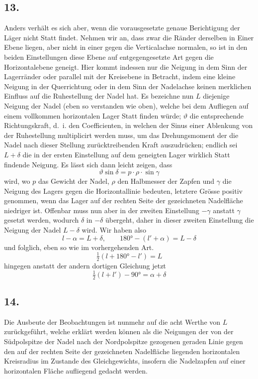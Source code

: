 \documentclass[12pt,a4paper]{article}
\begin{document}
\subsection*{13.}
Anders verhält es sich aber, wenn die vorausgesetzte genaue Berichtigung der Läger nicht Statt findet. Nehmen wir an, dass zwar die Ränder derselben in Einer Ebene liegen, aber nicht in einer gegen die Verticalachse normalen, so ist in den beiden Einstellungen diese Ebene auf entgegengesetzte Art gegen die Horizontalebene geneigt. Hier kommt indessen nur die Neigung in dem Sinn der Lagerränder oder parallel mit der Kreisebene in Betracht, indem eine kleine Neigung in der Querrichtung oder in dem Sinn der Nadelachse keinen merklichen Einfluss auf die Ruhestellung der Nadel hat. Es bezeichne nun $L$ diejenige Neigung der Nadel (eben so verstanden wie oben), welche bei dem Aufliegen auf einem vollkommen horizontalen Lager Statt finden würde; $\vartheta$ die entsprechende Richtungskraft, d.~i. den Coefficienten, in welchen der Sinus einer Ablenkung von der Ruhestellung multiplicirt werden muss, um das Drehungsmoment der die Nadel nach dieser Stellung zurücktreibenden Kraft auszudrücken; endlich sei $L + \delta$ die in der ersten Einstellung auf dem geneigten Lager wirklich Statt findende Neigung. Es lässt sich dann leicht zeigen, dass
\[ \vartheta \sin \delta = p \cdot \rho \cdot \sin \gamma \]
wird, wo $p$ das Gewicht der Nadel, $\rho$ den Halbmesser der Zapfen und $\gamma$ die Neigung des Lagers gegen die Horizontallinie bedeuten, letztere Grösse positiv genommen, wenn das Lager auf der rechten Seite der gezeichneten Nadelfläche niedriger ist. Offenbar muss nun aber in der zweiten Einstellung $-\gamma$ anstatt $\gamma$ gesetzt werden, wodurch $\delta$ in $-\delta$ übergeht, daher in dieser zweiten Einstellung die Neigung der Nadel $L - \delta$ wird. Wir haben also
\[ l - \alpha = L + \delta, \qquad 180° - (l' + \alpha) = L - \delta \]
und folglich, eben so wie im vorhergehenden Art.
\[ \tfrac{1}{2}(l + 180° - l') = L \]
hingegen anstatt der andern dortigen Gleichung jetzt
\[ \tfrac{1}{2}(l + l') - 90° = \alpha + \delta \]

\subsection*{14.}
Die Ausbeute der Beobachtungen ist nunmehr auf die acht Werthe von $L$ zurückgeführt, welche erklärt werden können als die Neigungen der von der Südpolspitze der Nadel nach der Nordpolspitze gezogenen geraden Linie gegen den auf der rechten Seite der gezeichneten Nadelfläche liegenden horizontalen Kreisradius im Zustande des Gleichgewichts, insofern die Nadelzapfen auf einer horizontalen Fläche aufliegend gedacht werden.
\end{document}
